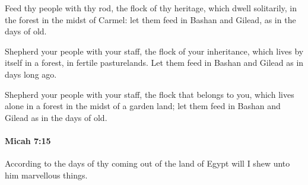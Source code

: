 			\begin{versebox}
					\item[BHS] 
					\item[LXX] 
					\item[ASV] Feed thy people with thy rod, the flock of thy heritage, which dwell solitarily, in the forest in the midst of Carmel: let them feed in Bashan and Gilead, as in the days of old.
					\item[NIV] Shepherd your people with your staff, the flock of your inheritance, which lives by itself in a forest, in fertile pasturelands. Let them feed in Bashan and Gilead as in days long ago.
					\item[NRSV] Shepherd your people with your staff, the flock that belongs to you, which lives alone in a forest in the midst of a garden land; let them feed in Bashan and Gilead as in the days of old.
			\end{versebox}

		\paragraph{Micah 7:15} %
			\label{MICAH-7-15}

			According to the days of thy coming out of the land of Egypt will I shew unto him marvellous things.

